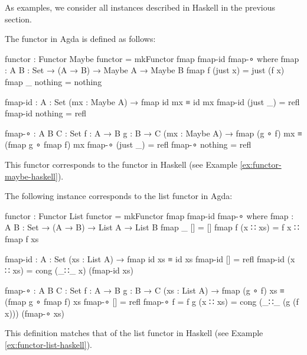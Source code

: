 As examples, we consider all instances described in Haskell in the
previous section.

\begin{example}
  \label{ex:functor-maybe-agda}

  The  functor in Agda is defined as follows:
  \begin{codeagda}
functor : Functor Maybe
functor = mkFunctor fmap fmap-id fmap-∘
  where
    fmap : {A B : Set} → (A → B) → Maybe A → Maybe B
    fmap f (just x) = just (f x)
    fmap _ nothing  = nothing

    fmap-id : {A : Set} (mx : Maybe A) → fmap id mx ≡ id mx
    fmap-id (just _) = refl
    fmap-id nothing  = refl

    fmap-∘ : {A B C : Set} {f : A → B} {g : B → C}
             (mx : Maybe A) → fmap (g ∘ f) mx ≡ (fmap g ∘ fmap f) mx
    fmap-∘ (just _) = refl
    fmap-∘ nothing  = refl
  \end{codeagda}
  This functor corresponds to the  functor in
  Haskell (see Example \ref{ex:functor-maybe-haskell}).

\end{example}

\begin{example}
  \label{ex:functor-list-agda}

  The following instance corresponds to the list functor in Agda:
  \begin{codeagda}
functor : Functor List
functor = mkFunctor fmap fmap-id fmap-∘
  where
    fmap : {A B : Set} → (A → B) → List A → List B
    fmap _ []       = []
    fmap f (x ∷ xs) = f x ∷ fmap f xs

    fmap-id : {A : Set} (xs : List A) → fmap id xs ≡ id xs
    fmap-id []       = refl
    fmap-id (x ∷ xs) = cong (_∷_ x) (fmap-id xs)

    fmap-∘ : {A B C : Set} {f : A → B} {g : B → C}
             (xs : List A) → fmap (g ∘ f) xs ≡ (fmap g ∘ fmap f) xs
    fmap-∘             []       = refl
    fmap-∘ {f = f} {g} (x ∷ xs) = cong (_∷_ (g (f x))) (fmap-∘ xs)
  \end{codeagda}
  This definition matches that of the list functor in Haskell (see
  Example \ref{ex:functor-list-haskell}).

\end{example}

